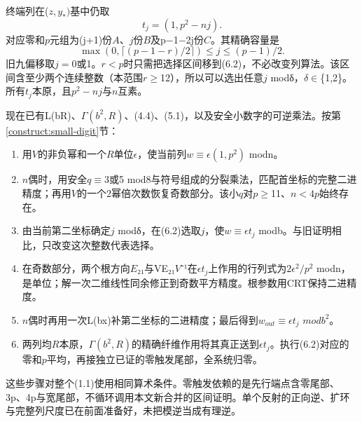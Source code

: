 {终端列在(\ensuremath{z,y_*)}基中仍取} \[
t_j=(1,p^2-nj).
\tag{C18.6.1}
\] {对应零和\ensuremath{p}元组为(j+1)份\ensuremath{A}、\ensuremath{j}份\ensuremath{B}及p−1−2j份\ensuremath{C}。其精确容量是} \[
\boxed{\max(0,\lceil(p-1-r)/2\rceil)\le j\le(p-1)/2.}
\tag{C18.6.2}
\] {旧九偏移取\ensuremath{j=0}或1。\ensuremath{r<p}时只需把选择区间移到(6.2)，不必改变列算法。该区间含至少两个连续整数（本范围\ensuremath{r}\ensuremath{\ge}12），所以可以选出任意\ensuremath{j}} {modδ，\ensuremath{\delta }\ensuremath{\in}\{1,2\}。所有\ensuremath{t_{j}}本原，且\ensuremath{p^{2}-nj}与\ensuremath{n}互素。}

{现在已有L(bR)、\ensuremath{\Gamma (b^{2},R)}、(4.4)、(5.1)，以及安全小数字的可逆乘法。按}第\ref{construct:small-digit}节{：}

\begin{enumerate}
\def\labelenumi{\arabic{enumi}.}
\tightlist
\item
  {用\ensuremath{V}的非负幂和一个\ensuremath{R}单位\ensuremath{\epsilon }，使当前列\ensuremath{w}\ensuremath{\equiv}\ensuremath{\epsilon (1,p^{2})}} {modn。}
\item
  {\ensuremath{n}偶时，用安全\ensuremath{q}\ensuremath{\equiv}3或5} {mod8与符号组成的分裂乘法，匹配首坐标的完整二进精度；再用\ensuremath{V}的一个2幂倍次数恢复奇数部分。该小\ensuremath{q}对\ensuremath{p}\ensuremath{\ge}11、\ensuremath{n<4p}始终存在。}
\item
  {由当前第二坐标确定\ensuremath{j}} {modδ，在(6.2)选取\ensuremath{j}，使\ensuremath{w}\ensuremath{\equiv}\ensuremath{\epsilon t_{j}}} {modb。与旧证明相比，只改变这次整数代表选择。}
\item
  {在奇数部分，两个根方向\ensuremath{E}₂₁与VE₂₁\ensuremath{V}⁻¹在\ensuremath{\epsilon t_{j}}上作用的行列式为\ensuremath{2\epsilon ^{2}/p^{2}}} {modn，是单位；解一次二维线性同余修正到奇数平方精度。根参数用CRT保持二进精度。}
\item
  {\ensuremath{n}偶时再用一次L(bx)补第二坐标的二进精度；最后得到\ensuremath{w_{out}}\ensuremath{\equiv}\ensuremath{\epsilon t_{j}}} {\ensuremath{modb^{2}}。}
\item
  {两列均\ensuremath{R}本原，\ensuremath{\Gamma (b^{2},R)}的精确纤维作用将其真正送到\ensuremath{\epsilon t_{j}}。执行(6.2)对应的零和\ensuremath{p}平均，再接独立已证的零触发尾部，全系统归零。}
\end{enumerate}

{这些步骤对整个(1.1)使用相同算术条件。零触发依赖的是先行端点含零尾部、3p、4p与宽尾部，不循环调用本文新合并的区间证明。单个反射的正向逆、扩环与完整列尺度已在前面准备好，未把模逆当成有理逆。}


